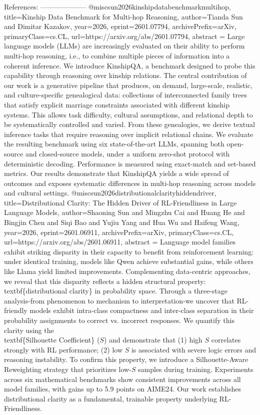         References:
        --------------------
        @misc{sun2026kinshipdatabenchmarkmultihop,
      title={Kinship Data Benchmark for Multi-hop Reasoning}, 
      author={Tianda Sun and Dimitar Kazakov},
      year={2026},
      eprint={2601.07794},
      archivePrefix={arXiv},
      primaryClass={cs.CL},
      url={https://arxiv.org/abs/2601.07794},
      abstract = {Large language models (LLMs) are increasingly evaluated on their ability to perform multi-hop reasoning, i.e., to combine multiple pieces of information into a coherent inference. We introduce KinshipQA, a benchmark designed to probe this capability through reasoning over kinship relations. The central contribution of our work is a generative pipeline that produces, on demand, large-scale, realistic, and culture-specific genealogical data: collections of interconnected family trees that satisfy explicit marriage constraints associated with different kinship systems. This allows task difficulty, cultural assumptions, and relational depth to be systematically controlled and varied. From these genealogies, we derive textual inference tasks that require reasoning over implicit relational chains. We evaluate the resulting benchmark using six state-of-the-art LLMs, spanning both open-source and closed-source models, under a uniform zero-shot protocol with deterministic decoding. Performance is measured using exact-match and set-based metrics. Our results demonstrate that KinshipQA yields a wide spread of outcomes and exposes systematic differences in multi-hop reasoning across models and cultural settings.}
}@misc{sun2026distributionalclarityhiddendriver,
      title={Distributional Clarity: The Hidden Driver of RL-Friendliness in Large Language Models}, 
      author={Shaoning Sun and Mingzhu Cai and Huang He and Bingjin Chen and Siqi Bao and Yujiu Yang and Hua Wu and Haifeng Wang},
      year={2026},
      eprint={2601.06911},
      archivePrefix={arXiv},
      primaryClass={cs.CL},
      url={https://arxiv.org/abs/2601.06911},
      abstract = {Language model families exhibit striking disparity in their capacity to benefit from reinforcement learning: under identical training, models like Qwen achieve substantial gains, while others like Llama yield limited improvements. Complementing data-centric approaches, we reveal that this disparity reflects a hidden structural property: \\textbf\{distributional clarity\} in probability space. Through a three-stage analysis-from phenomenon to mechanism to interpretation-we uncover that RL-friendly models exhibit intra-class compactness and inter-class separation in their probability assignments to correct vs. incorrect responses. We quantify this clarity using the \\textbf\{Silhouette Coefficient\} ($S$) and demonstrate that (1) high $S$ correlates strongly with RL performance; (2) low $S$ is associated with severe logic errors and reasoning instability. To confirm this property, we introduce a Silhouette-Aware Reweighting strategy that prioritizes low-$S$ samples during training. Experiments across six mathematical benchmarks show consistent improvements across all model families, with gains up to 5.9 points on AIME24. Our work establishes distributional clarity as a fundamental, trainable property underlying RL-Friendliness.}
}
